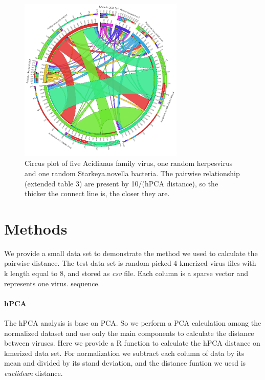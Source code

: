 \documentclass[12pt]{article}
\begin{document}
\begin{figure}
%
\begin{center}
%
\includegraphics[width=0.7\textwidth]{Circus_plot_of_five_Acidianus_family_virus.pdf}
%
\caption{\label{fig:circus}Circus plot of five Acidianus family virus, one random herpesvirus and one random Starkeya.novella bacteria. The pairwise relationship (extended table 3) are present by 10/(hPCA distance), so the thicker the connect line is, the closer they are.}
%
\end{center}
\end{figure}



\section*{Methods}
\label{sec:methods}

We provide a small data set to demonstrate the method we used to calculate the pairwise distance. The test data set is random picked 4 kmerized virus files with k length equal to 8, and stored as \emph{csv} file. Each column is a sparse vector and represents one virus. sequence.

\paragraph{hPCA} 

The hPCA analysis is base on PCA. So we perform a PCA calculation among the normalized dataset and use only the main components to calculate the distance between viruses. Here we provide a R function to calculate the hPCA distance on kmerized data set. For normalization we  subtract each column of data by its mean and divided by its stand deviation, and the distance funtion we uesd is \emph{euclidean} distance. 
\end{document}
